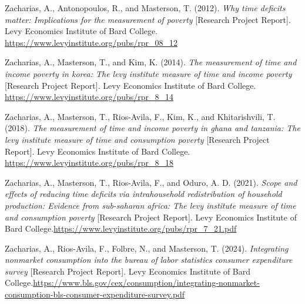 \documentclass[
  11pt,
]{article}
\newlength{\cslhangindent}
\newenvironment{CSLReferences}[2] %
 {\begin{list}{}{%
  \setlength{\itemindent}{0pt}
  \setlength{\leftmargin}{0pt}
  \setlength{\parsep}{0pt}
  \ifodd #1
   \setlength{\leftmargin}{\cslhangindent}
   \setlength{\itemindent}{-1\cslhangindent}
  \fi
  \setlength{\itemsep}{#2\baselineskip}}}
 {\end{list}}
\begin{document}
\begin{CSLReferences}{1}{0}
Zacharias, A., Antonopoulos, R., and Masterson, T. (2012). \emph{Why
time deficits matter: Implications for the measurement of poverty}
{[}Research Project Report{]}. Levy Economics Institute of Bard College.
\url{https://www.levyinstitute.org/pubs/rpr_08_12}

Zacharias, A., Masterson, T., and Kim, K. (2014). \emph{The measurement
of time and income poverty in korea: The levy institute measure of time
and income poverty} {[}Research Project Report{]}. Levy Economics
Institute of Bard College.
\url{https://www.levyinstitute.org/pubs/rpr_8_14}

Zacharias, A., Masterson, T., Rios-Avila, F., Kim, K., and
Khitarishvili, T. (2018). \emph{The measurement of time and income
poverty in ghana and tanzania: The levy institute measure of time and
consumption poverty} {[}Research Project Report{]}. Levy Economics
Institute of Bard College.
\url{https://www.levyinstitute.org/pubs/rpr_8_18}

Zacharias, A., Masterson, T., Rios-Avila, F., and Oduro, A. D. (2021).
\emph{Scope and effects of reducing time deficits via intrahousehold
redistribution of household production: Evidence from sub-saharan
africa: The levy institute measure of time and consumption poverty}
{[}Research Project Report{]}. Levy Economics Institute of Bard
College.\href{\%20https://www.levyinstitute.org/pubs/rpr_7_21.pdf}{https://www.levyinstitute.org/pubs/rpr\_7\_21.pdf}

Zacharias, A., Rios-Avila, F., Folbre, N., and Masterson, T. (2024).
\emph{Integrating nonmarket consumption into the bureau of labor
statistics consumer expenditure survey} {[}Research Project Report{]}.
Levy Economics Institute of Bard
College.\href{\%20https://www.bls.gov/cex/consumption/integrating-nonmarket-consumption-bls-consumer-expenditure-survey.pdf}{https://www.bls.gov/cex/consumption/integrating-nonmarket-consumption-bls-consumer-expenditure-survey.pdf}

\end{CSLReferences}
\end{document}
